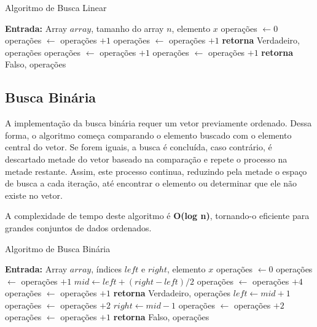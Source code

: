 \documentclass[12pt]{article}
\begin{document}
\begin{algorithm}
    \caption{Algoritmo de Busca Linear}
    \label{alg:estruturaDeDados_GD}
    \begin{algorithmic}
        \State \textbf{Entrada:} Array $array$, tamanho do array $n$, elemento $x$
        \State operações $\gets 0$
            \State operações $\gets$ operações $+ 1$
                \State operações $\gets$ operações $+ 1$
                \State \textbf{retorna} Verdadeiro, operações
            \EndIf
            \State operações $\gets$ operações $+ 1$
        \EndFor
        \State operações $\gets$ operações $+ 1$
        \State \textbf{retorna} Falso, operações
    \end{algorithmic}
\end{algorithm}

\newpage
\subsection{Busca Binária}
A implementação da busca binária requer um vetor previamente ordenado. Dessa forma, o algoritmo começa comparando o elemento buscado com o elemento central do vetor. Se forem iguais, a busca é concluída, caso contrário, é descartado metade do vetor baseado na comparação e repete o processo na metade restante. Assim, este processo continua, reduzindo pela metade o espaço de busca a cada iteração, até encontrar o elemento ou determinar que ele não existe no vetor. 

A complexidade de tempo deste algoritmo é \textbf{O(log n)}, tornando-o eficiente para grandes conjuntos de dados ordenados.

\begin{algorithm}
    \caption{Algoritmo de Busca Binária}
    \label{alg:estruturaDeDados_GD}
    \begin{algorithmic}
         \State \textbf{Entrada:} Array $array$, índices $left$ e $right$, elemento $x$
        \State operações $\gets 0$
            \State operações $\gets$ operações $+ 1$
            \State $mid \gets left + (right - left) / 2$
            \State operações $\gets$ operações $+ 4$
                \State operações $\gets$ operações $+ 1$
                \State \textbf{retorna} Verdadeiro, operações
                \State $left \gets mid + 1$
                \State operações $\gets$ operações $+ 2$
            \Else
                \State $right \gets mid - 1$
                \State operações $\gets$ operações $+ 2$
            \EndIf
        \EndWhile
        \State operações $\gets$ operações $+ 1$
        \State \textbf{retorna} Falso, operações
    \end{algorithmic}
\end{algorithm}
\end{document}

